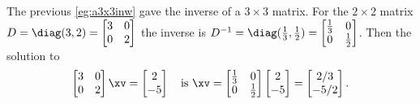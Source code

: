 \begin{example} \label{eg:}
The previous \autoref{eg:a3x3inw} gave the inverse of a \(3\times3\) matrix.  
For the \(2\times2\) matrix \(D=\diag(3,2)=\begin{bmatrix} 3&0\\0&2 \end{bmatrix}\) the inverse is \(D^{-1}=\diag(\frac13,\frac12)=\begin{bmatrix} \frac13&0\\0&\frac12 \end{bmatrix}\).  Then the solution to
\begin{equation*}
\begin{bmatrix} 3&0\\0&2 \end{bmatrix}\xv
=\begin{bmatrix} 2\\-5 \end{bmatrix}
\quad\text{is }\xv=\begin{bmatrix} \frac13&0\\0&\frac12 \end{bmatrix}
\begin{bmatrix} 2\\-5 \end{bmatrix}=\begin{bmatrix} 2/3\\-5/2 \end{bmatrix}.
\end{equation*}
\end{example}


